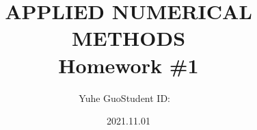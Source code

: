 \documentclass[letterpaper,14pt]{article}
\newtheorem{theorem}{Theorem}
\begin{document}

\title{APPLIED NUMERICAL METHODS\\Homework \#1}
\author{Yuhe Guo\quad Student ID: ~}
\date{2021.11.01}
\maketitle

% 





 



% 
% 
% 



% 
\end{document}
